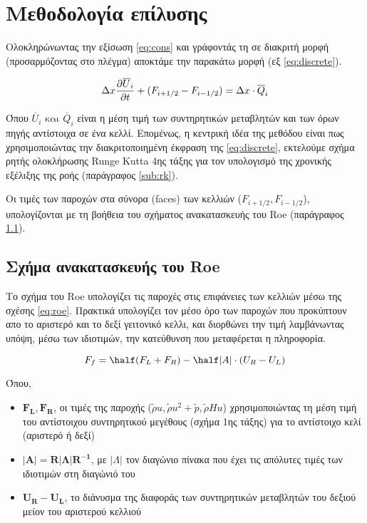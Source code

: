\section{Μεθοδολογία επίλυσης}

Ολοκληρώνωντας την εξίσωση \ref{eq:cons} και γράφοντάς τη σε διακριτή μορφή (προσαρμόζοντας στο πλέγμα) αποκτάμε την παρακάτω μορφή (εξ \ref{eq:discrete}).

\begin{equation}
    \Delta x\dfrac{\partial \overline{U}_i}{\partial t} + (F_{i+1/2} - F_{i-1/2}) = \Delta x \cdot \overline{Q}_i
    \label{eq:discrete}
\end{equation}

Όπου $\overline{U}_i \text{ και } \overline{Q}_i$ είναι η μέση τιμή των συντηρητικών μεταβλητών και των όρων πηγής αντίστοιχα σε ένα κελλί. Επομένως, η κεντρική ιδέα της μεθόδου είναι πως χρησιμοποιώντας την διακριτοποιημένη έκφραση της \ref{eq:discrete}, εκτελούμε σχήμα ρητής ολοκλήρωσης Runge Kutta 4ης τάξης για τον υπολογισμό της χρονικής εξέλιξης της ροής (παράγραφος \ref{sub:rk}). 

Οι τιμές των παροχών στα σύνορα (faces) των κελλιών ($F_{i+1/2}, F_{i-1/2}$), υπολογίζονται με τη βοήθεια του σχήματος ανακατασκευής του Roe (παράγραφος \ref{sub:roe}).

\subsection{Σχήμα ανακατασκευής του Roe} \label{sub:roe} 

Το σχήμα του Roe υπολογίζει τις παροχές στις επιφάνειες των κελλιών μέσω της σχέσης \ref{eq:roe}. Πρακτικά υπολογίζει τον μέσο όρο των παροχών που προκύπτουν απο το αριστερό και το δεξί γειτονικό κελλι, και διορθώνει την τιμή λαμβάνωντας υπόψη, μέσω των ιδιοτιμών, την κατεύθυνση που μεταφέρεται η πληροφορία. 

\begin{equation}
    F_f = \half (F_L + F_R) - \half |A|\cdot (U_R-U_L) 
    \label{eq:roe}
\end{equation}

Όπου,

\begin{itemize}
    \item $\mathbf{F_L, F_R}$, οι τιμές της παροχής ($\tilde{\rho}u, \tilde{\rho}u^2+\tilde{p}, \tilde{\rho}Hu$) χρησιμοποιώντας τη μέση τιμή του αντίστοιχου συντηρητικού μεγέθους (σχήμα 1ης τάξης) για το αντίστοιχο κελί (αριστερό ή δεξί)
    \item $\mathbf{|A|=R|Λ|R^{-1}}$, με $|\Lambda|$ τον διαγώνιο πίνακα που έχει τις απόλυτες τιμές των ιδιοτιμών στη διαγώνιό του 
    \item $\mathbf{U_R-U_L}$, το διάνυσμα της διαφοράς των συντηρητικών μεταβλητών του δεξιού μείον του αριστερού κελλιού
\end{itemize}


